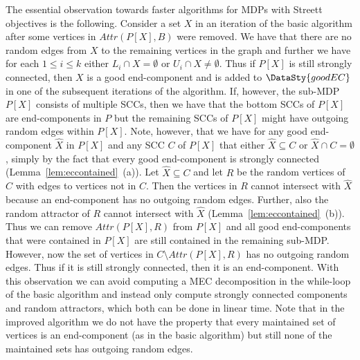 \documentclass[11pt,letterpaper]{article}
\newcommand{\lu}{\textup{(}}
\newcommand{\ru}{\textup{)}\xspace}
\newcommand{\upbr}[1]{\lu #1\ru}
\newcommand{\at}{\mathit{Attr}}
\newcommand{\mdp}{P\xspace}
\newcommand{\ec}{X\xspace}
\newcommand{\scc}{C\xspace}
\newcommand{\good}{\DataSty{goodEC}}
\newcommand{\badv}{B\xspace}
\begin{document}
The essential observation towards faster algorithms for MDPs with Streett objectives
is the following.
Consider a set $\ec$ in an iteration of the basic algorithm after 
some vertices in $\at(\mdp[\ec], \badv)$ were removed.
We have that there are no random edges from $\ec$ to the remaining vertices
in the graph and further we have for each $1 \le i \le k$ either $L_i \cap 
\ec = \emptyset$ or $U_i \cap \ec \ne \emptyset$. Thus if $\mdp[\ec]$ is still 
strongly connected, then $\ec$ is a good
end-component and is added to $\good$ in one of the subsequent iterations
of the algorithm. If, however, the sub-MDP $\mdp[\ec]$ consists of multiple SCCs, 
then we have that the bottom SCCs of $\mdp[\ec]$ are end-components in $\mdp$ 
but the remaining SCCs of $\mdp[\ec]$ might have outgoing random edges within
$\mdp[\ec]$. Note, however, that we have for any good end-component $\hat{\ec}$
in $\mdp[\ec]$ and any SCC $\scc$ of $\mdp[\ec]$ that either $\hat{\ec} \subseteq \scc$ 
or $\hat{\ec} \cap \scc = \emptyset$, simply by the fact that every good end-component
is strongly connected (Lemma~\ref{lem:eccontained}~\upbr{a}). Let $\hat{\ec} \subseteq \scc$ and let 
$R$ be the random vertices of $\scc$ with edges to 
vertices not in $\scc$. Then the vertices in $R$ cannot intersect with $\hat{\ec}$
because an end-component has no outgoing random edges. Further, also the 
random attractor of $R$ cannot intersect with $\hat{\ec}$ (Lemma~\ref{lem:eccontained}~\upbr{b}). Thus we can 
remove $\at(\mdp[\ec],
R)$ from $\mdp[\ec]$ and all good end-components that were contained
in $\mdp[\ec]$ are still contained in the remaining sub-MDP. However, now the 
set of vertices in $\scc \setminus \at(\mdp[\ec], R)$ has no outgoing random edges.
Thus if it is still strongly connected, then it is an end-component.
With this observation we can avoid computing a MEC decomposition in the 
while-loop of the basic algorithm and instead only compute strongly connected 
components and random attractors, which both can be done in linear time.
Note that in the improved algorithm we do not have the property that every 
maintained set of vertices is an end-component (as in the basic algorithm) but
still none of the maintained sets has outgoing random edges. 
\end{document}
